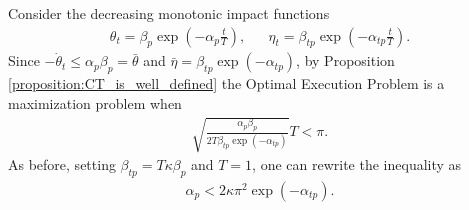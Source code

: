 \documentclass[final,3p,authoryear,12pt]{elsarticle}
\begin{document}
Consider the decreasing monotonic impact functions
\begin{align}
    \theta_{t} = \beta_{p}\exp\left(-\alpha_{p}\frac{t}{T}\right), && \eta_{t} = \beta_{tp}\exp\left(-\alpha_{tp}\frac{t}{T}\right).
\end{align}
Since $-\dot \theta_{t} \le \alpha_{p}\beta_{p}=\bar \theta$ and $\bar \eta=\beta_{tp}\exp(-\alpha_{tp})$, by Proposition \ref{proposition:CT_is_well_defined} the Optimal Execution Problem is a maximization problem when 
\begin{eqnarray}
    \sqrt{\frac{\alpha_{p}\beta_{p}}{2T\beta_{tp}\exp(-\alpha_{tp})}}T < \pi.
\end{eqnarray}
As before, setting $\beta_{tp}=T\kappa\beta_{p}$ and $T=1$, one can rewrite the inequality as
\begin{eqnarray}
\label{inequality:expo_exponents}
    \alpha_{p} < 2\kappa\pi^{2}\exp(-\alpha_{tp}).
\end{eqnarray}
\end{document}
